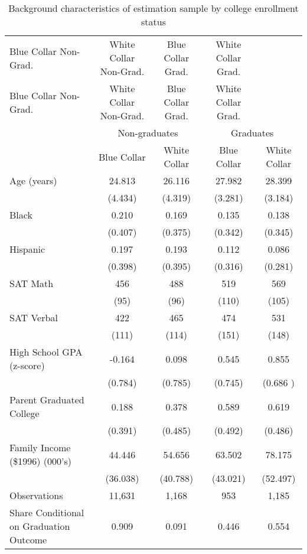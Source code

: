 \begin{table}[ht]
\caption{Background characteristics of estimation sample by college enrollment status}
\label{tab:sumStatsPost}
\centering
\begin{threeparttable}
\begin{tabular}{lcccc}
\toprule 
Blue Collar Non-Grad. & White Collar Non-Grad. & Blue Collar Grad. & White Collar Grad. \\
Blue Collar Non-Grad. & White Collar Non-Grad. & Blue Collar Grad. & White Collar Grad. \\
                               & \multicolumn{2}{c}{Non-graduates} & \multicolumn{2}{c}{Graduates} \\ \cmidrule(r){2-3}\cmidrule(l){4-5} 
                               & Blue Collar & White Collar & Blue Collar & White Collar \\
\midrule 
Age (years)    & 24.813 & 26.116 & 27.982 & 28.399 \\ 
     & (4.434) & (4.319) & (3.281) & (3.184) \\ 
Black     & 0.210 & 0.169 & 0.135 & 0.138 \\ 
     & (0.407) & (0.375) & (0.342) & (0.345) \\ 
Hispanic   & 0.197 & 0.193 & 0.112 & 0.086 \\ 
   & (0.398) & (0.395) & (0.316) & (0.281) \\ 
SAT Math     &  456 &  488 &  519 &  569 \\ 
     & (95) & (96) & (110) & (105) \\ 
SAT Verbal   &  422 &  465 &  474 &  531 \\ 
   & (111) & (114) & (151) & (148) \\ 
High School GPA (z-score)  & -0.164 & 0.098 & 0.545 & 0.855 \\ 
  & (0.784) & (0.785) & (0.745) & (0.686 ) \\ 
Parent Graduated College   & 0.188 & 0.378 & 0.589 & 0.619 \\ 
   & (0.391) & (0.485) & (0.492) & (0.486) \\ 
Family Income (\$1996) (000's)   & 44.446 & 54.656 & 63.502 & 78.175 \\ 
  & (36.038) & (40.788) & (43.021) & (52.497) \\ 
Observations   &  11,631 &   1,168 &     953 &   1,185 \\ 
Share Conditional on Graduation Outcome   & 0.909 & 0.091 & 0.446 & 0.554 \\ 
\bottomrule 
\end{tabular} 
\end{threeparttable} 
\end{table} 
